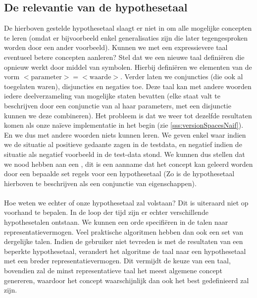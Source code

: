 \subsection{De relevantie van de hypothesetaal}
\label{sss:relevanceHypothesisLanguage}
De hierboven gestelde hypothesetaal slaagt er niet in om alle mogelijke concepten te leren (omdat er bijvoorbeeld enkel generalisaties zijn die later tegengesproken worden door een ander voorbeeld). Kunnen we met een expressievere taal eventueel betere concepten aanleren? Stel dat we een nieuwe taal defini\"eren die opnieuw werkt door middel van symbolen. Hierbij defini\"eren we elementen van de vorm $<\mbox{parameter}>=<\mbox{waarde}>$. Verder laten we conjuncties (die ook al toegelaten waren), disjuncties en negaties toe. Deze taal kan met andere woorden iedere deelverzameling van mogelijke staten bevatten (elke staat valt te beschrijven door een conjunctie van al haar parameters, met een disjunctie kunnen we deze combineren). Het probleem is dat we weer tot dezelfde resultaten komen als onze na\"ieve implementatie in het begin (zie \ref{sss:versionSpacesNaif}). En we dus met andere woorden niets kunnen leren. We geven enkel waar indien we de situatie al positieve gedaante zagen in de testdata, en negatief indien de situatie als negatief voorbeeld in de test-data stond. We kunnen dus stellen dat we nood hebben aan een , dit is een aanname dat het concept kan geleerd worden door een bepaalde set regels voor een hypothesetaal (Zo is de hypothesetaal hierboven te beschrijven als een conjunctie van eigenschappen).
\paragraph{}Hoe weten we echter of onze hypothesetaal zal volstaan? Dit is uiteraard niet op voorhand te bepalen. In de loop der tijd zijn er echter verschillende hypothesetalen ontstaan. We kunnen een orde specifi\"eren in de talen naar representatievermogen. Veel praktische algoritmen hebben dan ook een set van dergelijke talen. Indien de gebruiker niet tevreden is met de resultaten van een beperkte hypothesetaal, verandert het algoritme de taal naar een hypothesetaal met een breder representatievermogen. Dit vermijdt de keuze van een taal, bovendien zal de minst representatieve taal het meest algemene concept genereren, waardoor het concept waarschijnlijk dan ook het best gedefinieerd zal zijn.
